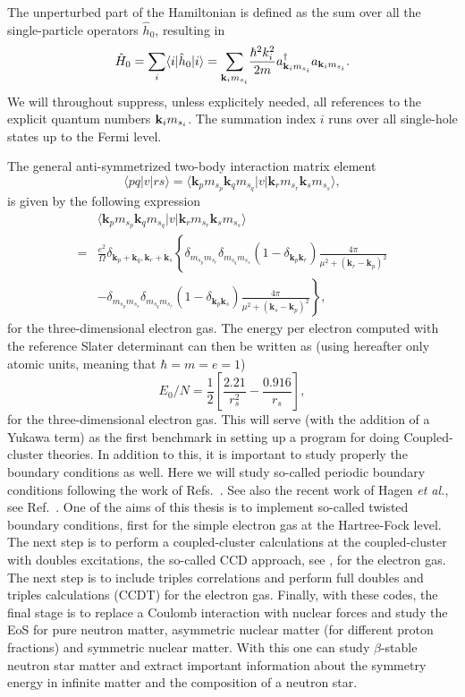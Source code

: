 \documentclass[aps,prc,twocolumn,showpacs,floatfix,nofootinbib,preprintnumbers,superscriptaddress,amsmath,amssymb]{revtex4-1}
\begin{document}
The unperturbed part
of the Hamiltonian is defined as the sum over all the single-particle
operators $\hat{h}_0$, resulting in
\[
\hat{H}_{0}=\sum_i\langle i|\hat{h}_0|i \rangle= {\displaystyle\sum_{{\bf k}_{i}m_{s_i}}}
\frac{\hbar^{2}k_i^{2}}{2m}a_{{\bf k}_{i}m_{s_i}}^{\dagger}
a_{{\bf k}_{i}m_{s_i}}.
\]
We will throughout suppress, unless explicitely needed, all references
to the explicit quantum numbers ${\bf k}_{i}m_{s_i}$. The summation
index $i$ runs over all single-hole states up to the Fermi level.

The general anti-symmetrized two-body interaction matrix element
\[
\langle pq |v| r s \rangle = \langle
\mathbf{k}_{p}m_{s_{p}}\mathbf{k}_{q}m_{s_{q}}|v|\mathbf{k}_{r}m_{s_{r}}\mathbf{k}_{s}m_{s_{s}}\rangle,
\]
is given by the following expression
  \begin{align}
    & \langle
    \mathbf{k}_{p}m_{s_{p}}\mathbf{k}_{q}m_{s_{q}}|v|\mathbf{k}_{r}m_{s_{r}}\mathbf{k}_{s}m_{s_{s}}\rangle
    \nonumber \\ =&
    \frac{e^{2}}{\Omega}\delta_{\mathbf{k}_{p}+\mathbf{k}_{q},
      \mathbf{k}_{r}+\mathbf{k}_{s}}\left\{
    \delta_{m_{s_{p}}m_{s_{r}}}\delta_{m_{s_{q}}m_{s_{s}}}(1-\delta_{\mathbf{k}_{p}\mathbf{k}_{r}})\frac{4\pi
    }{\mu^{2} + (\mathbf{k}_{r}-\mathbf{k}_{p})^{2}} \right. \nonumber
    \\ & \left. -
    \delta_{m_{s_{p}}m_{s_{s}}}\delta_{m_{s_{q}}m_{s_{r}}}(1-\delta_{\mathbf{k}_{p}\mathbf{k}_{s}})\frac{4\pi
    }{\mu^{2} + (\mathbf{k}_{s}-\mathbf{k}_{p})^{2}} \right\},
    \nonumber
  \end{align}
for the three-dimensional electron gas.  The energy per electron computed with
the reference Slater determinant can then be written as 
(using hereafter only atomic units, meaning that $\hbar = m = e = 1$)
\[
E_0/N=\frac{1}{2}\left[\frac{2.21}{r_s^2}-\frac{0.916}{r_s}\right],
\]
for the three-dimensional electron gas.  This will serve (with the
addition of a Yukawa term) as the first benchmark in setting up a
program for doing Coupled-cluster theories.  In addition to this, it
is important to study properly the boundary conditions as well. Here
we will study so-called periodic boundary conditions following the
work of Refs.~\cite{gros1992,gros1996,lin2001}. See also the recent
work of Hagen {\em et al.}, see Ref.~\cite{hagen2014}. One of the aims
of this thesis is to implement so-called twisted boundary conditions,
first for the simple electron gas at the Hartree-Fock level. The next
step is to perform a coupled-cluster calculations at the
coupled-cluster with doubles excitations, the so-called CCD approach,
see \cite{shavittbartlett2009}, for the electron gas.  The next step
is to include triples correlations and perform full doubles and
triples calculations (CCDT) for the electron gas. Finally, with these
codes, the final stage is to replace a Coulomb interaction with
nuclear forces and study the EoS for pure neutron matter, asymmetric
nuclear matter (for different proton fractions) and symmetric nuclear
matter. With this one can study $\beta$-stable neutron star matter and
extract important information about the symmetry energy in infinite
matter and the composition of a neutron star.
\end{document}

